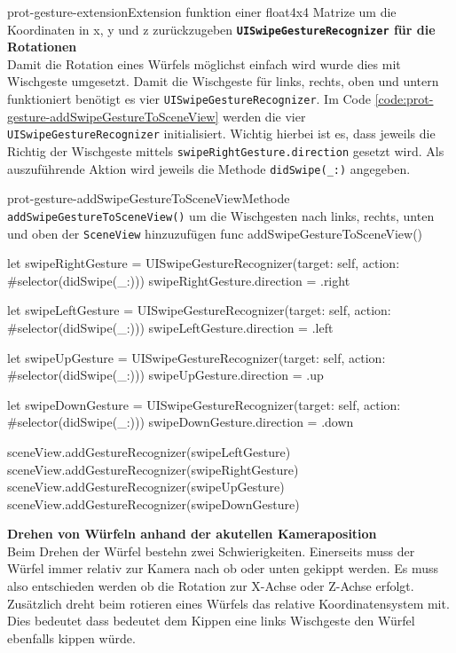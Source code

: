 \begin{description}
\begin{code}{prot-gesture-extension}{Extension funktion einer float4x4 Matrize um die Koordinaten in x, y und z zurückzugeben}
    \textbf{\texttt{UISwipeGestureRecognizer} für die Rotationen}\\

    Damit die Rotation eines Würfels möglichst einfach wird wurde dies mit Wischgeste umgesetzt. Damit die Wischgeste für links, rechts, oben und untern funktioniert benötigt es vier \texttt{UISwipeGestureRecognizer}. Im Code \ref{code:prot-gesture-addSwipeGestureToSceneView} werden die vier \texttt{UISwipeGestureRecognizer} initialisiert. Wichtig hierbei ist es, dass jeweils die Richtig der Wischgeste mittels \texttt{swipeRightGesture.direction} gesetzt wird. Als auszuführende Aktion wird jeweils die Methode \texttt{didSwipe(\_:)} angegeben.
    
    \begin{code}{prot-gesture-addSwipeGestureToSceneView}{Methode \texttt{addSwipeGestureToSceneView()} um die Wischgesten nach links, rechts, unten und oben der \texttt{SceneView} hinzuzufügen}
    func addSwipeGestureToSceneView() {
        let swipeRightGesture = UISwipeGestureRecognizer(target: self, action: #selector(didSwipe(_:)))
        swipeRightGesture.direction = .right
        
        let swipeLeftGesture = UISwipeGestureRecognizer(target: self, action: #selector(didSwipe(_:)))
        swipeLeftGesture.direction = .left
        
        let swipeUpGesture = UISwipeGestureRecognizer(target: self, action: #selector(didSwipe(_:)))
        swipeUpGesture.direction = .up
        
        let swipeDownGesture = UISwipeGestureRecognizer(target: self, action: #selector(didSwipe(_:)))
        swipeDownGesture.direction = .down
        
        sceneView.addGestureRecognizer(swipeLeftGesture)
        sceneView.addGestureRecognizer(swipeRightGesture)
        sceneView.addGestureRecognizer(swipeUpGesture)
        sceneView.addGestureRecognizer(swipeDownGesture)
    }
    \end{code}

    \textbf{Drehen von Würfeln anhand der akutellen Kameraposition}\\

    Beim Drehen der Würfel bestehn zwei Schwierigkeiten. Einerseits muss der Würfel immer relativ zur Kamera nach ob oder unten gekippt werden. Es muss also entschieden werden ob die Rotation zur X-Achse oder Z-Achse erfolgt. Zusätzlich dreht beim rotieren eines Würfels das relative Koordinatensystem mit. Dies bedeutet dass bedeutet dem Kippen eine links Wischgeste den Würfel ebenfalls kippen würde.


\end{code}
\end{description}
